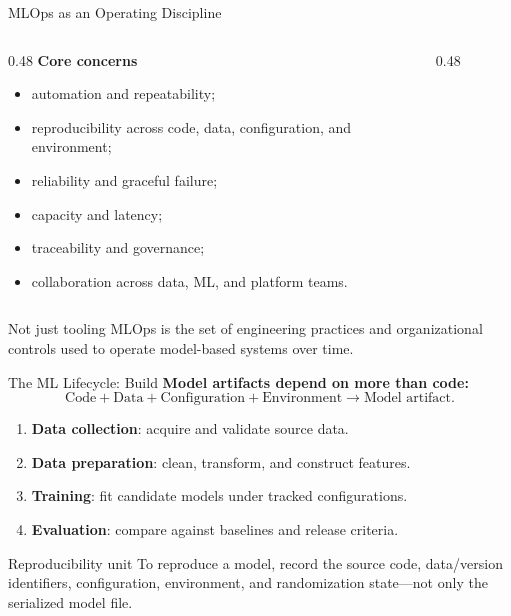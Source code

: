 \begin{frame}{MLOps as an Operating Discipline}
\begin{columns}
\begin{column}{0.48\textwidth}
\textbf{Core concerns}
\begin{itemize}
  \item automation and repeatability;
  \item reproducibility across code, data, configuration, and environment;
  \item reliability and graceful failure;
  \item capacity and latency;
  \item traceability and governance;
  \item collaboration across data, ML, and platform teams.
\end{itemize}
\end{column}

\begin{column}{0.48\textwidth}
\begin{figure}
\centering
{}
\end{figure}
\end{column}
\end{columns}

\begin{block}{Not just tooling}
MLOps is the set of engineering practices and organizational controls used to operate model-based systems over time.
\end{block}
\end{frame}

\begin{frame}{The ML Lifecycle: Build}
\textbf{Model artifacts depend on more than code:}
\[
\text{Code} + \text{Data} + \text{Configuration} + \text{Environment}
\longrightarrow \text{Model artifact}.
\]

\begin{enumerate}
  \item \textbf{Data collection}: acquire and validate source data.
  \item \textbf{Data preparation}: clean, transform, and construct features.
  \item \textbf{Training}: fit candidate models under tracked configurations.
  \item \textbf{Evaluation}: compare against baselines and release criteria.
\end{enumerate}

\begin{alertblock}{Reproducibility unit}
To reproduce a model, record the source code, data/version identifiers, configuration, environment, and randomization state—not only the serialized model file.
\end{alertblock}
\end{frame}

